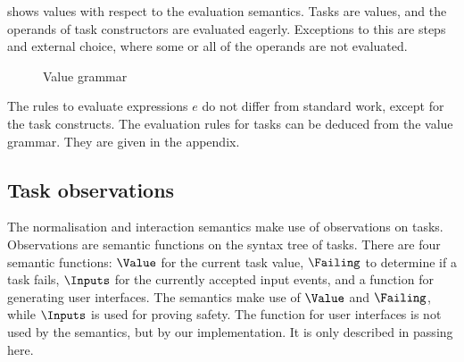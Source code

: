  shows values with respect to the evaluation semantics.
Tasks are values, and the operands of task constructors are evaluated eagerly.
Exceptions to this are steps and external choice, where some or all of the operands are not evaluated.

\begin{figure}[h]
  \small
  \caption{Value grammar} \label{fig:value-grammar}
\end{figure}

The rules to evaluate expressions $e$ do not differ from standard work, except for the task constructs.
The evaluation rules for tasks can be deduced from the value grammar.
They are given in the appendix.

%
%


\subsection{Task observations}


The normalisation and interaction semantics make use of observations on tasks.
Observations are semantic functions on the syntax tree of tasks.
There are four semantic functions: $\Value$ for the current task value, $\Failing$ to determine if a task fails, $\Inputs$ for the currently accepted input events, and a function for generating user interfaces.
The semantics make use of $\Value$ and $\Failing$, while $\Inputs$ is used for proving safety.
The function for user interfaces is not used by the semantics, but by our implementation.
It is only described in passing here.




